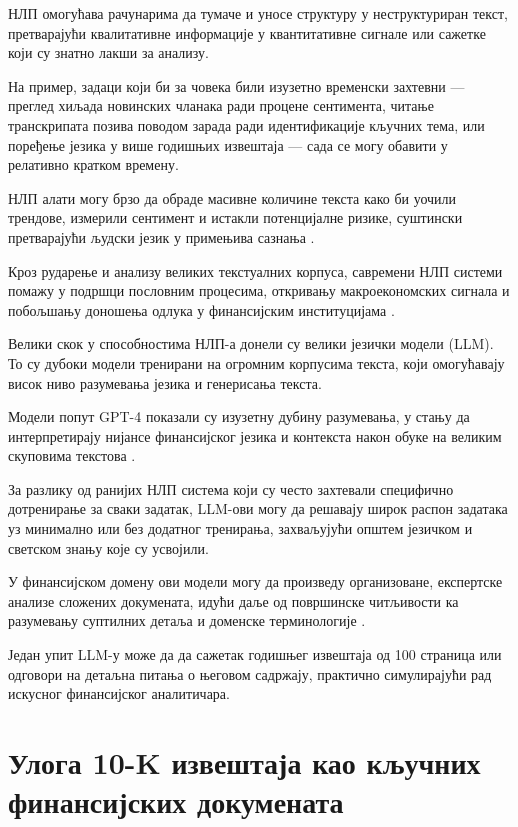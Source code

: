 \documentclass[a4paper, 12pt, master, utf8]{etf}
\begin{document}
НЛП омогућава рачунарима да тумаче и уносе структуру у неструктуриран текст, претварајући квалитативне информације у квантитативне сигнале или сажетке који су знатно лакши за анализу. 

На пример, задаци који би за човека били изузетно временски захтевни — преглед хиљада новинских чланака ради процене сентимента, читање транскрипата позива поводом зарада ради идентификације кључних тема, или поређење језика у више годишњих извештаја — сада се могу обавити у релативно кратком времену. 

НЛП алати могу брзо да обраде масивне количине текста како би уочили трендове, измерили сентимент и истакли потенцијалне ризике, суштински претварајући људски језик у примењива сазнања \cite{paro_ai_strategic_2023}. 

Кроз рударење и анализу великих текстуалних корпуса, савремени НЛП системи помажу у подршци пословним процесима, откривању макроекономских сигнала и побољшању доношења одлука у финансијским институцијама \cite{yang_evaluating_2025}.

Велики скок у способностима НЛП-а донели су велики језички модели (LLM). То су дубоки модели тренирани на огромним корпусима текста, који омогућавају висок ниво разумевања језика и генерисања текста. 

Модели попут GPT-4 показали су изузетну дубину разумевања, у стању да интерпретирају нијансе финансијског језика и контекста након обуке на великим скуповима текстова \cite{paro_ai_strategic_2023}. 

За разлику од ранијих НЛП система који су често захтевали специфично дотренирање за сваки задатак, LLM-ови могу да решавају широк распон задатака уз минимално или без додатног тренирања, захваљујући општем језичком и светском знању које су усвојили. 

У финансијском домену ови модели могу да произведу организоване, експертске анализе сложених докумената, идући даље од површинске читљивости ка разумевању суптилних детаља и доменске терминологије \cite{yang_evaluating_2025}. 

Један упит LLM-у може да да сажетак годишњег извештаја од 100 страница или одговори на детаљна питања о његовом садржају, практично симулирајући рад искусног финансијског аналитичара.

\section{Улога 10-K извештаја као кључних финансијских докумената}
\end{document}
